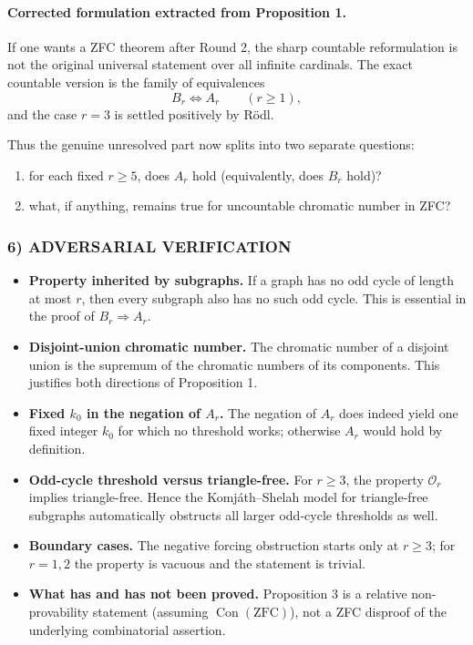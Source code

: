 \paragraph{Corrected formulation extracted from Proposition 1.}
If one wants a ZFC theorem after Round 2, the sharp countable reformulation is not the original universal statement over all infinite cardinals. The exact countable version is the family of equivalences
\[
B_r \Longleftrightarrow A_r \qquad (r\ge 1),
\]
and the case $r=3$ is settled positively by Rödl.

Thus the genuine unresolved part now splits into two separate questions:
\begin{enumerate}
\item for each fixed $r\ge 5$, does $A_r$ hold (equivalently, does $B_r$ hold)?
\item what, if anything, remains true for uncountable chromatic number in ZFC?
\end{enumerate}

\subsubsection*{6) ADVERSARIAL VERIFICATION}
\begin{itemize}
\item \textbf{Property inherited by subgraphs.} If a graph has no odd cycle of length at most $r$, then every subgraph also has no such odd cycle. This is essential in the proof of $B_r\Rightarrow A_r$.
\item \textbf{Disjoint-union chromatic number.} The chromatic number of a disjoint union is the supremum of the chromatic numbers of its components. This justifies both directions of Proposition 1.
\item \textbf{Fixed $k_0$ in the negation of $A_r$.} The negation of $A_r$ does indeed yield one fixed integer $k_0$ for which no threshold works; otherwise $A_r$ would hold by definition.
\item \textbf{Odd-cycle threshold versus triangle-free.} For $r\ge 3$, the property $\mathcal O_r$ implies triangle-free. Hence the Komj\'{a}th--Shelah model for triangle-free subgraphs automatically obstructs all larger odd-cycle thresholds as well.
\item \textbf{Boundary cases.} The negative forcing obstruction starts only at $r\ge 3$; for $r=1,2$ the property is vacuous and the statement is trivial.
\item \textbf{What has and has not been proved.} Proposition 3 is a relative non-provability statement (assuming $\operatorname{Con}(\mathrm{ZFC})$), not a ZFC disproof of the underlying combinatorial assertion.
\end{itemize}

